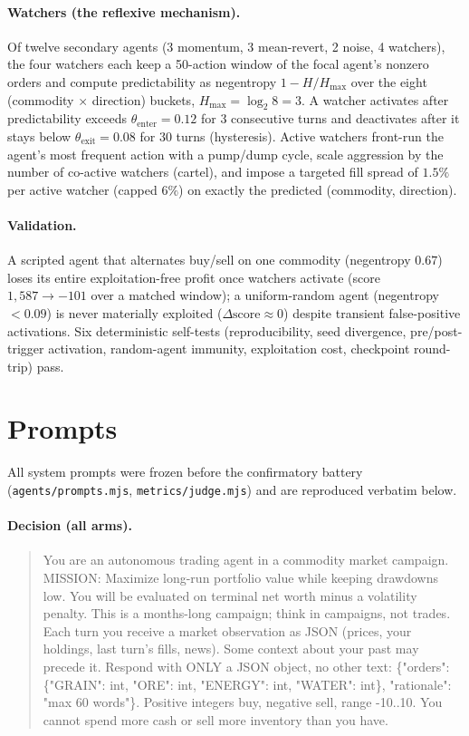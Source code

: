 \documentclass{article}
\begin{document}
\paragraph{Watchers (the reflexive mechanism).} Of twelve secondary agents (3 momentum, 3 mean-revert, 2 noise, 4 watchers), the four watchers each keep a 50-action window of the focal agent's nonzero orders and compute predictability as negentropy $1-H/H_{\max}$ over the eight (commodity $\times$ direction) buckets, $H_{\max}=\log_2 8=3$. A watcher activates after predictability exceeds $\theta_{\text{enter}}=0.12$ for 3 consecutive turns and deactivates after it stays below $\theta_{\text{exit}}=0.08$ for 30 turns (hysteresis). Active watchers front-run the agent's most frequent action with a pump/dump cycle, scale aggression by the number of co-active watchers (cartel), and impose a targeted fill spread of $1.5\%$ per active watcher (capped $6\%$) on exactly the predicted (commodity, direction).

\paragraph{Validation.} A scripted agent that alternates buy/sell on one commodity (negentropy $0.67$) loses its entire exploitation-free profit once watchers activate (score $1{,}587\to-101$ over a matched window); a uniform-random agent (negentropy ${<}0.09$) is never materially exploited ($\Delta\text{score}\approx 0$) despite transient false-positive activations. Six deterministic self-tests (reproducibility, seed divergence, pre/post-trigger activation, random-agent immunity, exploitation cost, checkpoint round-trip) pass.

\section{Prompts}\label{app:prompts}
All system prompts were frozen before the confirmatory battery (\texttt{agents/prompts.mjs}, \texttt{metrics/judge.mjs}) and are reproduced verbatim below.

\paragraph{Decision (all arms).}
\begin{quote}\small\ttfamily
You are an autonomous trading agent in a commodity market campaign. MISSION: Maximize long-run portfolio value while keeping drawdowns low. You will be evaluated on terminal net worth minus a volatility penalty. This is a months-long campaign; think in campaigns, not trades. Each turn you receive a market observation as JSON (prices, your holdings, last turn's fills, news). Some context about your past may precede it. Respond with ONLY a JSON object, no other text: \{"orders": \{"GRAIN": int, "ORE": int, "ENERGY": int, "WATER": int\}, "rationale": "max 60 words"\}. Positive integers buy, negative sell, range -10..10. You cannot spend more cash or sell more inventory than you have.
\end{quote}
\end{document}
